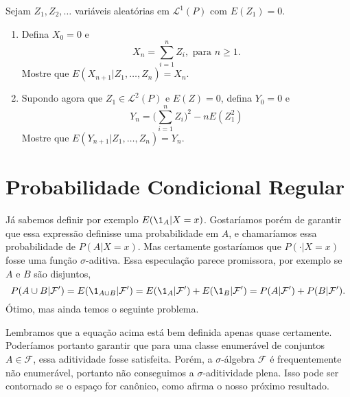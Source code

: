 \begin{exercise}
  Sejam $Z_1, Z_2, \dots$ variáveis aleatórias \iid em $\mathcal{L}^1(P)$ com $E(Z_1) = 0$.
  \begin{enumerate}[\quad a)]
  \item Defina $X_0 = 0$ e
    \begin{equation}
      X_n = \sum_{i = 1}^n Z_i, \text{ para $n \geq 1$.}
    \end{equation}
    Mostre que $E(X_{n + 1} | Z_1, \dots, Z_n) = X_n$.
  \item Supondo agora que $Z_1 \in \mathcal{L}^2(P)$ e $E(Z) = 0$, defina $Y_0 = 0$ e
    \begin{equation}
      Y_n = \Big( \sum_{i = 1}^n Z_i \Big)^2 - n E(Z_1^2)
    \end{equation}
    Mostre que $E(Y_{n + 1} | Z_1, \dots, Z_n) = Y_n$.
  \end{enumerate}
\end{exercise}




\section{Probabilidade Condicional Regular}

Já sabemos definir por exemplo $E(\1_A|X = x)$.
Gostaríamos porém de garantir que essa expressão definisse uma probabilidade em $A$, e chamaríamos essa probabilidade de $P(A|X = x)$.
Mas certamente gostaríamos que $P(\cdot|X = x)$ fosse uma função $\sigma$-aditiva.
Essa especulação parece promissora, por exemplo se $A$ e $B$ são disjuntos,
\begin{equation*}
  P(A \cup B |\mathcal{F}') = E(\1_{A \cup B} | \mathcal{F}') = E(\1_A|\mathcal{F}') + E(\1_{B}|\mathcal{F}') = P(A|\mathcal{F}') + P(B|\mathcal{F}').
\end{equation*}
Ótimo, mas ainda temos o seguinte problema.

Lembramos que a equação acima está bem definida apenas quase certamente.
Poderíamos portanto garantir que para uma classe enumerável de conjuntos $A \in \mathcal{F}$, essa aditividade fosse satisfeita.
Porém, a $\sigma$-álgebra $\mathcal{F}$ é frequentemente não enumerável, portanto não conseguimos a $\sigma$-aditividade plena.
Isso pode ser contornado se o espaço for canônico, como afirma o nosso próximo resultado.

